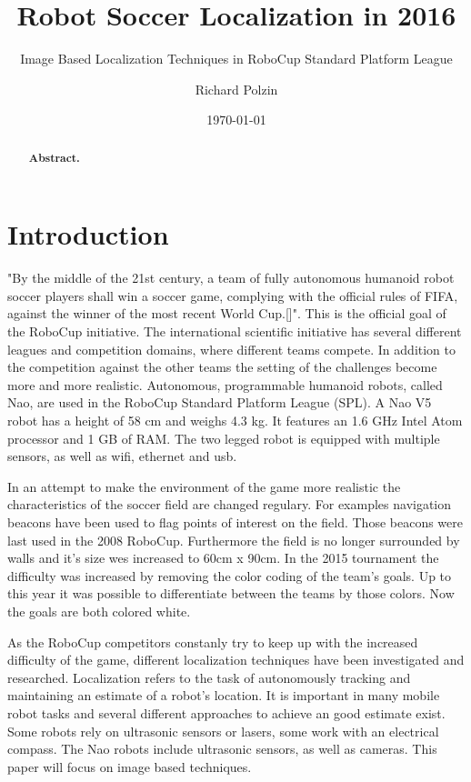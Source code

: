 \documentclass[12pt, a4paper]{scrartcl}
\author{Richard Polzin}
\title{Robot Soccer Localization in 2016}
\subtitle{Image Based Localization Techniques in RoboCup Standard Platform League}
\date{\today}
\begin{document}
  \maketitle

  \begin{abstract}
    \textbf{Abstract.}
  \end{abstract}

  \section{Introduction}
  "By the middle of the 21st century, a team of fully autonomous humanoid robot soccer players shall win a soccer game, complying with the official rules of FIFA, against the winner of the most recent World Cup.[]". This is the official goal of the RoboCup initiative. The international scientific initiative has several different leagues and competition domains, where different teams compete. In addition to the competition against the other teams the setting of the challenges become more and more realistic. Autonomous, programmable humanoid robots, called Nao, are used in the RoboCup Standard Platform League (SPL). A Nao V5 robot has a height of 58 cm and weighs 4.3 kg. It features an 1.6 GHz Intel Atom processor and 1 GB of RAM. The two legged robot is equipped with multiple sensors, as well as wifi, ethernet and usb.

  In an attempt to make the environment of the game more realistic the characteristics of the soccer field are changed regulary. For examples navigation beacons have been used to flag points of interest on the field. Those beacons were last used in the 2008 RoboCup. Furthermore the field is no longer surrounded by walls and it's size wes increased to 60cm x 90cm. In the 2015 tournament the difficulty was increased by removing the color coding of the team's goals. Up to this year it was possible to differentiate between the teams by those colors. Now the goals are both colored white.

  As the RoboCup competitors constanly try to keep up with the increased difficulty of the game, different localization techniques have been investigated and researched. Localization refers to the task of autonomously tracking and maintaining an estimate of a robot's location. It is important in many mobile robot tasks and several different approaches to achieve an good estimate exist. Some robots rely on ultrasonic sensors or lasers, some work with an electrical compass. The Nao robots include ultrasonic sensors, as well as cameras. This paper will focus on image based techniques.
\end{document}
